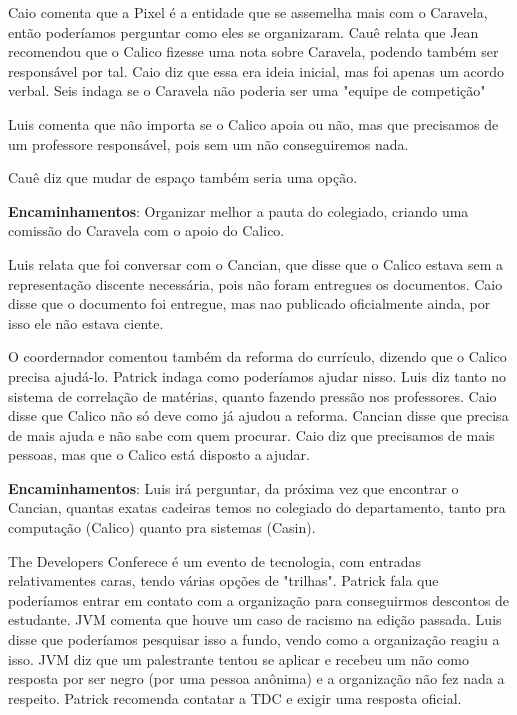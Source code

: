 \documentclass{ata-calico}
\begin{document}
Caio comenta que a Pixel é a entidade que se assemelha mais com o Caravela, então poderíamos perguntar como eles se organizaram.
Cauê relata que Jean recomendou que o Calico fizesse uma nota sobre Caravela, podendo também ser responsável por tal. Caio diz que essa era ideia inicial, mas foi apenas um acordo verbal. Seis indaga se o Caravela não poderia ser uma "equipe de competição"

Luis comenta que não importa se o Calico apoia ou não, mas que precisamos de um professore responsável, pois sem um não conseguiremos nada.

Cauê diz que mudar de espaço também seria uma opção.\newline

\textbf{Encaminhamentos}: Organizar melhor a pauta do colegiado, criando uma comissão do Caravela com o apoio do Calico.


Luis relata que foi conversar com o Cancian, que disse que o Calico estava sem a representação discente necessária, pois não foram entregues os documentos. Caio disse que o documento foi entregue, mas nao publicado oficialmente ainda, por isso ele não estava ciente. 

O coordernador comentou também da reforma do currículo, dizendo que o Calico precisa ajudá-lo. Patrick indaga como poderíamos ajudar nisso. Luis diz tanto no sistema de correlação de matérias, quanto fazendo pressão nos professores. Caio disse que Calico não só deve como já ajudou a reforma. Cancian disse que precisa de mais ajuda e não sabe com quem procurar. Caio diz que precisamos de mais pessoas, mas que o Calico está disposto a ajudar.\newline

\textbf{Encaminhamentos}: Luis irá perguntar, da próxima vez que encontrar o Cancian, quantas exatas cadeiras temos no colegiado do departamento, tanto pra computação (Calico) quanto pra sistemas (Casin).


The Developers Conferece é um evento de tecnologia, com entradas relativamentes caras, tendo várias opções de "trilhas". Patrick fala que poderíamos entrar em contato com a organização para conseguirmos descontos de estudante. JVM comenta que houve um caso de racismo na edição passada. Luis disse que poderíamos pesquisar isso a fundo, vendo como a organização reagiu a isso. JVM diz que um palestrante tentou se aplicar e recebeu um não como resposta por ser negro (por uma pessoa anônima) e a organização não fez nada a respeito. Patrick recomenda contatar a TDC e exigir uma resposta oficial.\newline
\end{document}

